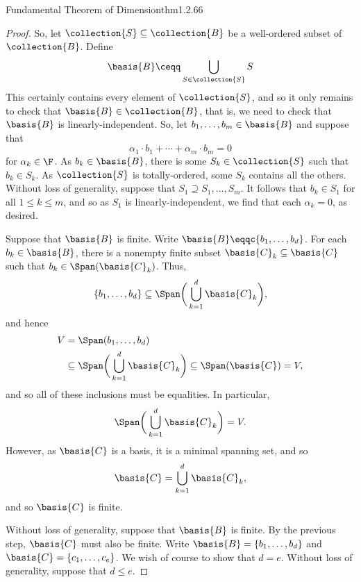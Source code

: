 \begin{thm}{Fundamental Theorem of Dimension}{thm1.2.66}
\begin{proof}
		So, let $\collection{S}\subseteq \collection{B}$ be a well-ordered subset of $\collection{B}$.  Define
		\begin{equation}
		\basis{B}\ceqq \bigcup _{S\in \collection{S}}S
		\end{equation}
		This certainly contains every element of $\collection{S}$, and so it only remains to check that $\basis{B}\in \collection{B}$, that is, we need to check that $\basis{B}$ is linearly-independent.  So, let $b_1,\ldots ,b_m\in \basis{B}$ and suppose that
		\begin{equation}
		\alpha _1\cdot b_1+\cdots +\alpha _m\cdot b_m=0
		\end{equation}
		for $\alpha _k\in \F$.  As $b_k\in \basis{B}$, there is some $S_k\in \collection{S}$ such that $b_k\in S_k$.  As $\collection{S}$ is totally-ordered, some $S_k$ contains all the others.  Without loss of generality, suppose that $S_1\supseteq S_1,\ldots ,S_m$.  It follows that $b_k\in S_1$ for all $1\leq k\leq m$, and so as $S_1$ is linearly-independent, we find that each $\alpha _k=0$, as desired.
		
		Suppose that $\basis{B}$ is finite.  Write $\basis{B}\eqqc \{ b_1,\ldots ,b_d\}$.  For each $b_k\in \basis{B}$, there is a nonempty finite subset $\basis{C}_k\subseteq \basis{C}$ such that $b_k\in \Span (\basis{C}_k)$.  Thus,
		\begin{equation}
		\{ b_1,\ldots ,b_d\} \subseteq \Span \bigg( \bigcup _{k=1}^d\basis{C}_k\bigg) ,
		\end{equation}
		and hence
		\begin{equation}
		\begin{split}
		V & =\Span (b_1,\ldots ,b_d) \\
		& \subseteq \Span \bigg( \bigcup _{k=1}^d\basis{C}_k\bigg) \subseteq \Span (\basis{C})=V,
		\end{split}
		\end{equation}
		and so all of these inclusions must be equalities.  In particular,
		\begin{equation}
		\Span \bigg( \bigcup _{k=1}^d\basis{C}_k\bigg) =V.
		\end{equation}
		However, as $\basis{C}$ is a basis, it is a minimal spanning set, and so
		\begin{equation}
		\basis{C}=\bigcup _{k=1}^d\basis{C}_k,
		\end{equation}
		and so $\basis{C}$ is finite.
		
		Without loss of generality, suppose that $\basis{B}$ is finite.  By the previous step, $\basis{C}$ must also be finite.  Write $\basis{B}=\{ b_1,\ldots ,b_d\}$ and $\basis{C}=\{ c_1,\ldots ,c_e\}$.  We wish of course to show that $d=e$.  Without loss of generality, suppose that $d\leq e$.
		

\end{proof}
\end{thm}

